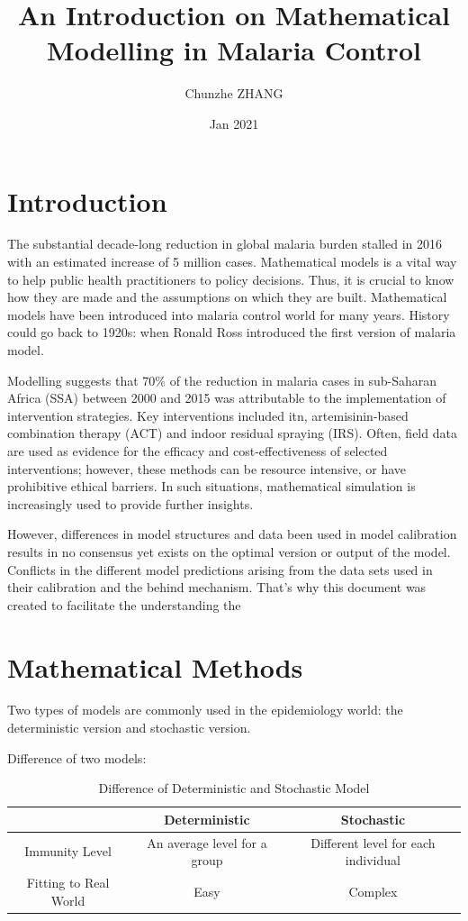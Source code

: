 \documentclass[a4paper, 12pt, twoside]{article}
\title{An Introduction on Mathematical Modelling in Malaria Control}
\author{Chunzhe ZHANG}
\date{Jan 2021}
\begin{document}
\begin{titlepage}
\maketitle
\end{titlepage}

\tableofcontents

\section{Introduction}
The substantial decade-long reduction in global malaria burden stalled in 2016 with an estimated increase of 5 million cases.
Mathematical models is a vital way to help public health practitioners to policy decisions.
Thus, it is crucial to know how they are made and the assumptions on which they are built.
Mathematical models have been introduced into malaria control world for many years.
History could go back to 1920s: when Ronald Ross introduced the first version of malaria model.

Modelling suggests that 70\% of the reduction in malaria cases in sub-Saharan Africa (SSA) between 2000 and 2015 was attributable to the implementation of intervention strategies.
Key interventions included \gls{itn}, artemisinin-based combination therapy (ACT) and indoor residual spraying (IRS).
Often, field data are used as evidence for the efficacy and cost-effectiveness of selected interventions; however, these methods can be resource intensive, or have prohibitive ethical barriers.
In such situations, mathematical simulation is increasingly used to provide further insights.

However, differences in model structures and data been used in model calibration results in no consensus yet exists on the optimal version or output of the model.
Conflicts in the different model predictions arising from the data sets used in their calibration and the behind mechanism. 
That's why this document was created to facilitate the understanding the 

\section{Mathematical Methods}

Two types of models are commonly used in the epidemiology world: the deterministic version and stochastic version.

Difference of two models:
\begin{table}[ht]
\centering
\label{tab:difference}
\begin{tabular}{c c c}
\toprule
 & Deterministic & Stochastic\\
\midrule
Immunity Level & An average level for a group & Different level for each individual \\
Fitting to Real World & Easy & Complex \\
\bottomrule
\end{tabular}
\caption{Difference of Deterministic and Stochastic Model}
\end{table}
\end{document}
